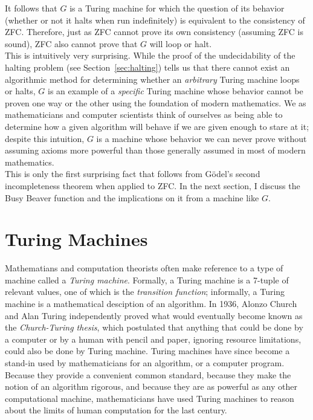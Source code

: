 \documentclass{report}
\begin{document}
It follows that $G$ is a Turing machine for which the question of its behavior (whether or not it halts when run indefinitely) is equivalent to the consistency of ZFC. Therefore, just as ZFC cannot prove its own consistency (assuming ZFC is sound), ZFC also cannot prove that $G$ will loop or halt. \\

This is intuitively very surprising. While the proof of the undecidability of the halting problem (see Section~\ref{sec:halting}) tells us that there cannot exist an algorithmic method for determining whether an \emph{arbitrary} Turing machine loops or halts, $G$ is an example of a \emph{specific} Turing machine whose behavior cannot be proven one way or the other using the foundation of modern mathematics. We as mathematicians and computer scientists think of ourselves as being able to determine how a given algorithm will behave if we are given enough to stare at it; despite this intuition, $G$ is a machine whose behavior we can never prove without assuming axioms more powerful than those generally assumed in most of modern mathematics. \\

This is only the first surprising fact that follows from G\"{o}del's second incompleteness theorem when applied to ZFC. In the next section, I discuss the Busy Beaver function and the implications on it from a machine like $G$.

\section{Turing Machines \label{sec:tm}}

Mathematians and computation theorists often make reference to a type of machine called a \emph{Turing machine}. Formally, a Turing machine is a 7-tuple of relevant values, one of which is the \emph{transition function}; informally, a Turing machine is a mathematical desciption of an algorithm. In 1936, Alonzo Church and Alan Turing independently proved what would eventually become known as the \emph{Church-Turing thesis}, which postulated that anything that could be done by a computer or by a human with pencil and paper, ignoring resource limitations, could also be done by Turing machine. Turing machines have since become a stand-in used by mathematicians for an algorithm, or a computer program. Because they provide a convenient common standard, because they make the notion of an algorithm rigorous, and because they are as powerful as any other computational machine, mathematicians have used Turing machines to reason about the limits of human computation for the last century. \\
\end{document}
